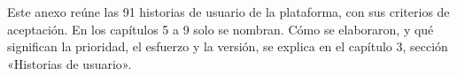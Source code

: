 Este anexo reúne las 91 historias de usuario de la plataforma, con sus criterios de aceptación. En los capítulos 5 a 9 solo se nombran. Cómo se elaboraron, y qué significan la prioridad, el esfuerzo y la versión, se explica en el capítulo 3, sección «Historias de usuario».


